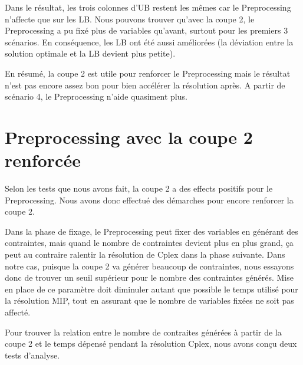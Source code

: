 Dans le résultat, les trois colonnes d'UB restent les mêmes car le Preprocessing n'affecte que sur les LB. Nous pouvons trouver qu'avec la coupe 2, le Preprocessing a pu fixé plus de variables qu'avant, surtout pour les premiers 3 scénarios. En conséquence, les LB ont été aussi améliorées (la déviation entre la solution optimale et la LB devient plus petite).

En résumé, la coupe 2 est utile pour renforcer le Preprocessing mais le résultat n'est pas encore assez bon pour bien accélérer la résolution après. A partir de scénario 4, le Preprocessing n'aide quasiment plus.



\section{Preprocessing avec la coupe 2 renforcée}
Selon les tests que nous avons fait, la coupe 2 a des effects positifs pour le Preprocessing. Nous avons donc effectué des démarches pour encore renforcer la coupe 2.

Dans la phase de fixage, le Preprocessing peut fixer des variables en générant des contraintes, mais quand le nombre de contraintes devient plus en plus grand, ça peut au contraire ralentir la résolution de Cplex dans la phase suivante. Dans notre cas, puisque la coupe 2 va générer beaucoup de contraintes, nous essayons donc de trouver un seuil supérieur pour le nombre des contraintes générés. Mise en place de ce paramètre doit diminuler autant que possible le temps utilisé pour la résolution MIP, tout en assurant que le nombre de variables fixées ne soit pas affecté.

Pour trouver la relation entre le nombre de contraites générées à partir de la coupe 2 et le temps dépensé pendant la résolution Cplex, nous avons conçu deux tests d'analyse.

